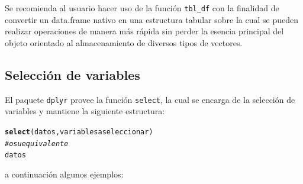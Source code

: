 \documentclass[11pt,a4paper,oneside]{book}\usepackage[]{graphicx}\usepackage[]{color}
\makeatletter
\newcommand{\hlcom}[1]{\textcolor[rgb]{0.678,0.584,0.686}{\textit{#1}}}%
\newcommand{\hlkwd}[1]{\textcolor[rgb]{0.737,0.353,0.396}{\textbf{#1}}}%
\newenvironment{kframe}{%
 \def\at@end@of@kframe{}%
 \ifinner\ifhmode%
  \def\at@end@of@kframe{\end{minipage}}%
  \begin{minipage}{\columnwidth}%
 \fi\fi%
 \def\FrameCommand##1{\hskip\@totalleftmargin \hskip-\fboxsep
 \colorbox{shadecolor}{##1}\hskip-\fboxsep
     \hskip-\linewidth \hskip-\@totalleftmargin \hskip\columnwidth}%
 \MakeFramed {\advance\hsize-\width
   \@totalleftmargin\z@ \linewidth\hsize
   \@setminipage}}%
 {\par\unskip\endMakeFramed%
 \at@end@of@kframe}
\newenvironment{knitrout}{}{} %
\makeatother
\begin{document}
\begin{itemize}
Se recomienda al usuario hacer uso de la función \texttt{tbl\_df} con la finalidad de convertir un data.frame nativo en una estructura tabular sobre la cual se pueden realizar operaciones de manera más rápida sin perder la esencia principal del objeto orientado al almacenamiento de diversos tipos de vectores.

\subsection{Selección de variables}

El paquete \texttt{dplyr} provee la función \texttt{select}, la cual se encarga de la selección de variables y mantiene la siguiente estructura:

\begin{knitrout}
\color{fgcolor}\begin{kframe}
\begin{alltt}
\hlkwd{select}(datos, variables a seleccionar)
\hlcom{# o su equivalente}
datos %
\end{alltt}
\end{kframe}
\end{knitrout}

a continuación algunos ejemplos:


\end{itemize}
\end{document}
